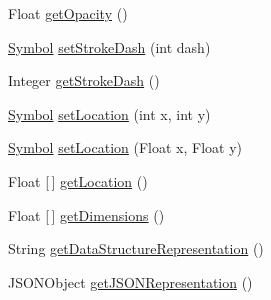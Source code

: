 \begin{DoxyCompactItemize}
\item 
Float \mbox{\hyperlink{classbridges_1_1base_1_1_symbol_a0135a9633599ee1a463f7bd83c425d02}{get\+Opacity}} ()
\item 
\mbox{\hyperlink{classbridges_1_1base_1_1_symbol}{Symbol}} \mbox{\hyperlink{classbridges_1_1base_1_1_symbol_ad36224ec7cb588dbbaa8040ef59ffbfc}{set\+Stroke\+Dash}} (int dash)
\item 
Integer \mbox{\hyperlink{classbridges_1_1base_1_1_symbol_a31ff460ae6b24ed968c1045e2533a967}{get\+Stroke\+Dash}} ()
\item 
\mbox{\hyperlink{classbridges_1_1base_1_1_symbol}{Symbol}} \mbox{\hyperlink{classbridges_1_1base_1_1_symbol_ab378b9b3c5ab203fbb4661697f7f7e0a}{set\+Location}} (int x, int y)
\item 
\mbox{\hyperlink{classbridges_1_1base_1_1_symbol}{Symbol}} \mbox{\hyperlink{classbridges_1_1base_1_1_symbol_a7d02e54c0cdfcaa7cb26176474207e39}{set\+Location}} (Float x, Float y)
\item 
Float \mbox{[}$\,$\mbox{]} \mbox{\hyperlink{classbridges_1_1base_1_1_symbol_a73b96ca5cafe7da7b38aa7e7e57fc1d4}{get\+Location}} ()
\item 
Float \mbox{[}$\,$\mbox{]} \mbox{\hyperlink{classbridges_1_1base_1_1_symbol_a68a8abc4e07c0d63dbda79b65383ee8f}{get\+Dimensions}} ()
\item 
String \mbox{\hyperlink{classbridges_1_1base_1_1_symbol_a37ceb17196bdc4d0e379958835cc45c2}{get\+Data\+Structure\+Representation}} ()
\item 
J\+S\+O\+N\+Object \mbox{\hyperlink{classbridges_1_1base_1_1_symbol_aeba4cfa5b39fe03e72a568a8b7452e60}{get\+J\+S\+O\+N\+Representation}} ()
\end{DoxyCompactItemize}
